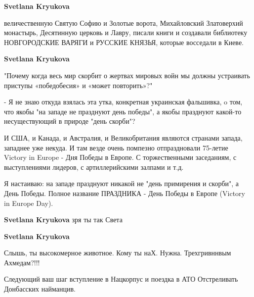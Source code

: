 \begin{itemize}
\begin{itemize}
\textbf{Svetlana Kryukova} 

величественную Святую Софию и Золотые ворота, Михайловский Златоверхий
монастырь, Десятинную церковь и Лавру, писали книги и создавали библиотеку
НОВГОРОДСКИЕ ВАРЯГИ и РУССКИЕ КНЯЗЬЯ, которые восседали в Киеве.

 
\textbf{Svetlana Kryukova} 

"Почему когда весь мир скорбит о жертвах мировых войн мы должны устраивать
приступы «победобесия» и «может повторить»?"

- Я не знаю откуда взялась эта утка, конкретная украинская фальшивка, o том,
что якобы "на западе не празднуют день победы", а якобы празднуют какой-то
несуществующий в природе "день скорби"?

И США, и Канада, и Австралия, и Великобритания являются странами запада,
западнее уже некуда. \Smiley[1.0][yellow] И там везде очень помпезно отпраздновали 75-летие
Victory in Europe - Дня Победы в Европе. С торжественными заседаниям, с
выступлениями лидеров, с артиллерийскими залпами и т.д.

Я настаиваю: на западе празднуют никакой не "день примирения и скорби", а День
Победы. Полное название ПРАЗДНИКА - День Победы в Европе (Victory in Europe
Day).

 
\textbf{Svetlana Kryukova} зря ты так Света

 
\textbf{Svetlana Kryukova}

Слышь, ты высокомерное животное. Кому ты наХ. Нужна. Трехгривннвым Ахмедам?!!!

Следующий ваш шаг вступление в Нацкорпус и поездка в АТО Отстреливать
Донбасских найманцив.

 

\end{itemize}
\end{itemize}
